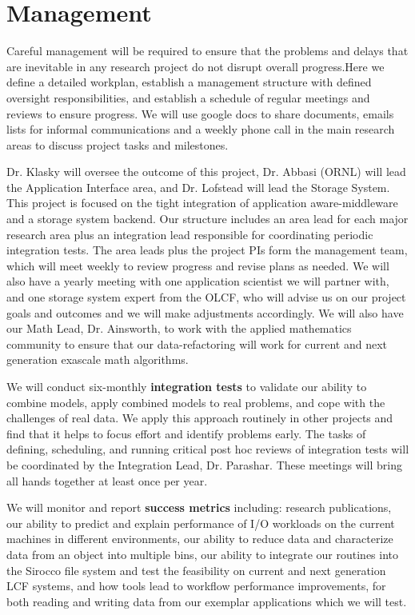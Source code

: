 \section{Management}
\label{sec:management}

Careful management will be required to ensure that the problems and delays that are inevitable in any research project
do not  disrupt overall progress.Here we define a detailed workplan,
establish a  management structure with defined oversight responsibilities, and establish a schedule of regular meetings and
reviews to ensure progress.  We will use google docs to share documents, emails lists for informal communications and a 
weekly phone call in the main research areas to discuss project tasks and milestones. 

Dr. Klasky will oversee the outcome of this project,  Dr. Abbasi (ORNL) will lead the Application Interface area, and Dr. Lofstead
will lead the Storage System. This project is focused on the tight integration of application aware-middleware and a storage system backend.
Our structure includes an area lead for each major research area plus
an integration lead responsible for coordinating periodic integration tests. The area leads plus the project PIs
form the management team, which will meet weekly to review progress and revise plans as needed.
We will also have a  yearly meeting with  one application scientist we will partner with,  and one storage system expert from the 
OLCF, who will advise us on our project goals and outcomes and we will make adjustments accordingly. We will also have our
Math Lead, Dr. Ainsworth, to work with the applied mathematics community to ensure that our data-refactoring will work 
for current and next generation exascale math algorithms. 

We will conduct six-monthly {\bf integration tests}  to validate our ability to combine models, apply
combined models to real problems, and cope with the challenges of real data. We apply this approach routinely
in other projects and find that it helps to focus effort and identify problems early. The tasks of defining,
scheduling, and running critical post hoc reviews of integration tests will be coordinated by the Integration Lead, Dr. Parashar. 
These meetings will bring all hands together at least once per year.

We will monitor and report {\bf success metrics} including: 
research publications, 
our ability to predict and explain performance of I/O workloads on the current machines in different environments, 
our ability to reduce data and characterize data from an object into multiple bins, 
our ability to integrate our routines into the Sirocco file system and test the feasibility on current and next generation LCF systems, and
how tools lead to workflow performance improvements, for both reading and writing data from our exemplar applications which we will test.
